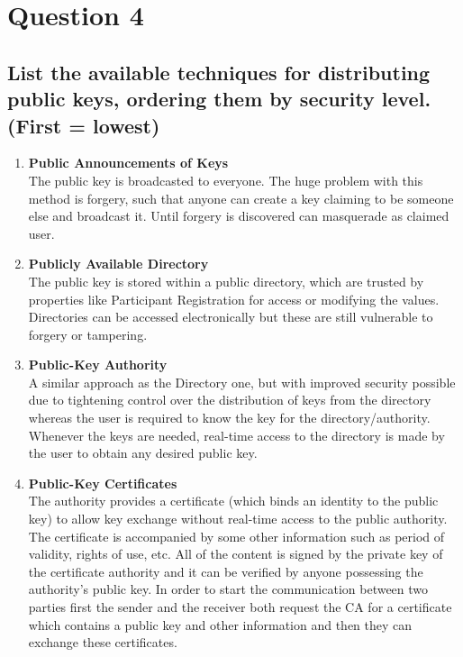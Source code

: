 \documentclass{report}
\begin{document}
	\section{Question 4}
	\startsection
		\renewcommand{\thesubsection}{\thesection.\Alph{subsection}}
		\subsection{List the available techniques for distributing public keys, ordering them by security level. (First = lowest)}
		\begin{enumerate}[\textbullet]
			\item \textbf{Public Announcements of Keys} \\
			The public key is broadcasted to everyone. The huge problem with this method is forgery, such that anyone can create a key claiming to be someone else and broadcast it. Until forgery is discovered can masquerade as claimed user. 
			\item \textbf{Publicly Available Directory} \\
			The public key is stored within a public directory, which are trusted by properties like Participant Registration for access or modifying the values. Directories can be accessed electronically but these are still vulnerable to forgery or tampering. 
			\item \textbf{Public-Key Authority} \\
			A similar approach as the Directory one, but with improved security possible due to tightening control over the distribution of keys from the directory whereas the user is required to know the key for the directory/authority. Whenever the keys are needed, real-time access to the directory is made by the user to obtain any desired public key. 
			\item \textbf{Public-Key Certificates} \\
			The authority provides a certificate (which binds an identity to the public key) to allow key exchange without real-time access to the public authority. The certificate is accompanied by some other information such as period of validity, rights of use, etc. All of the content is signed by the private key of the certificate authority and it can be verified by anyone possessing the authority’s public key. In order to start the communication between two parties first the sender and the receiver both request the CA for a certificate which contains a public key and other information and then they can exchange these certificates.
		\end{enumerate}
	\closesection
\end{document}
